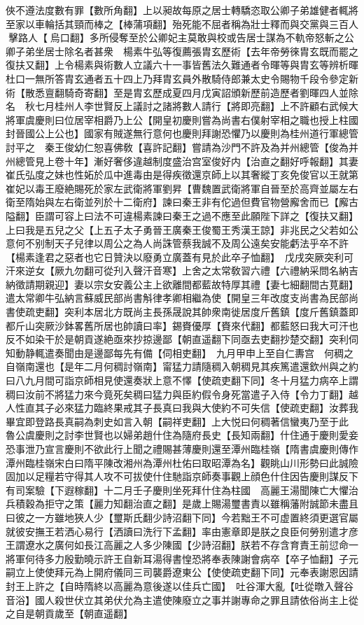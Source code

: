 俠不遵法度數有罪【數所角翻】上以昶故每原之居士轉驕恣取公卿子弟雄健者輒將至家以車輪括其頸而棒之【棒蒲項翻】殆死能不屈者稱為壯士釋而與交黨與三百人擊路人【烏口翻】多所侵奪至於公卿妃主莫敢與校或告居士謀為不軌帝怒斬之公卿子弟坐居士除名者甚衆　楊素牛弘等復薦張胄玄歷術【去年帝勞徠胄玄既而罷之復扶又翻】上令楊素與術數人立議六十一事皆舊法久難通者令暉等與胄玄等辨析暉杜口一無所答胄玄通者五十四上乃拜胄玄員外散騎侍郎兼太史令賜物千段令參定新術【散悉亶翻騎奇寄翻】至是胄玄歷成夏四月戊寅詔頒新歷前造歷者劉暉四人並除名　秋七月桂州人李世賢反上議討之諸將數人請行【將即亮翻】上不許顧右武候大將軍虞慶則曰位居宰相爵乃上公【開皇初慶則嘗為尚書右僕射宰相之職也授上柱國封晉國公上公也】國家有賊遂無行意何也慶則拜謝恐懼乃以慶則為桂州道行軍總管討平之　秦王俊幼仁恕喜佛敎【喜許記翻】嘗請為沙門不許及為并州總管【俊為并州總管見上卷十年】漸好奢侈違越制度盛治宫室俊好内【治直之翻好呼報翻】其妻崔氏弘度之妹也性妬於瓜中進毒由是得疾徵還京師上以其奢縱丁亥免俊官以王就第崔妃以毒王廢絶賜死於家左武衛將軍劉昇【曹魏置武衛將軍自晉至於高齊並屬左右衛至隋始與左右衛並列於十二衛府】諫曰秦王非有佗過但費官物營廨舍而已【廨古隘翻】臣謂可容上曰法不可違楊素諫曰秦王之過不應至此願陛下詳之【復扶又翻】上曰我是五兒之父【上五子太子勇晉王廣秦王俊蜀王秀漢王諒】非兆民之父若如公意何不别制天子兒律以周公之為人尚誅管蔡我誠不及周公遠矣安能虧法乎卒不許【楊素逢君之惡者也它日贊決以廢勇立廣蓋有見於此卒子恤翻】　戊戌突厥突利可汗來逆女【厥九勿翻可從刋入聲汗音寒】上舍之太常敎習六禮【六禮納采問名納吉納徵請期親迎】妻以宗女安義公主上欲離間都藍故特厚其禮【妻七細翻間古莧翻】遣太常卿牛弘納言蘇威民部尚書斛律孝卿相繼為使【開皇三年改度支尚書為民部尚書使疏吏翻】突利本居北方既尚主長孫晟說其帥衆南徙居度斤舊鎮【度斤舊鎮蓋即都斤山突厥沙鉢畧舊所居也帥讀曰率】錫賚優厚【賚來代翻】都藍怒曰我大可汗也反不如染干於是朝貢遂絶亟來抄掠邊鄙【朝直遥翻下同亟去吏翻抄楚交翻】突利伺知動静輒遣奏聞由是邊鄙每先有備【伺相吏翻】　九月甲申上至自仁夀宫　何稠之自嶺南還也【是年二月何稠討嶺南】甯猛力請隨稠入朝稠見其疾篤遣還欽州與之約曰八九月間可詣京師相見使還奏狀上意不懌【使疏吏翻下同】冬十月猛力病卒上謂稠曰汝前不將猛力來今竟死矣稠曰猛力與臣約假令身死當遣子入侍【令力丁翻】越人性直其子必來猛力臨終果戒其子長真曰我與大使約不可失信【使疏吏翻】汝葬我畢宜即登路長真嗣為刺史如言入朝【嗣祥吏翻】上大悦曰何稠著信蠻夷乃至于此　魯公虞慶則之討李世賢也以婦弟趙什住為隨府長史【長知兩翻】什住通于慶則愛妾恐事泄乃宣言慶則不欲此行上聞之禮賜甚薄慶則還至潭州臨桂嶺【隋書虞慶則傳作潭州臨桂嶺宋白曰隋平陳改湘州為潭州杜佑曰取昭潭為名】觀眺山川形勢曰此誠險固加以足糧若守得其人攻不可拔使什住馳詣京師奏事觀上顔色什住因告慶則謀反下有司案驗【下遐稼翻】十二月壬子慶則坐死拜什住為柱國　高麗王湯聞陳亡大懼治兵積穀為拒守之策【麗力知翻治直之翻】是歲上賜湯璽書責以雖稱藩附誠節未盡且曰彼之一方雖地狹人少【璽斯氏翻少詩沼翻下同】今若黜王不可虚置終須更選官屬就彼安撫王若洒心易行【洒讀曰洗行下孟翻】率由憲章即是朕之良臣何勞别遣才彦王謂遼水之廣何如長江高麗之人多少陳國【少詩沼翻】朕若不存含育責王前愆命一將軍何待多力殷勤曉示許王自新耳湯得書惶恐將奉表陳謝會病卒【卒子恤翻】子元嗣立上使使拜元為上開府儀同三司襲爵遼東公【使使疏吏翻下同】元奉表謝恩因請封王上許之【自時隋終以高麗為意後遂以佳兵亡國】　吐谷渾大亂【吐從暾入聲谷音浴】國人殺世伏立其弟伏允為主遣使陳廢立之事并謝專命之罪且請依俗尚主上從之自是朝貢歲至【朝直遥翻】

